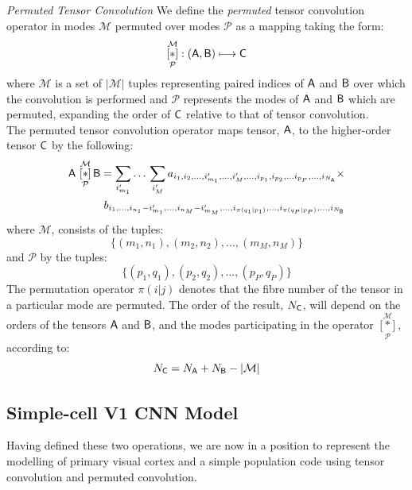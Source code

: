 \begin{definition}{\it Permuted Tensor Convolution} We define the {\it permuted} tensor convolution operator in modes $\mathcal{M}$ permuted over modes $\mathcal{P}$ as a mapping taking the form:
\[
 \underset{\mathcal{P}}{\overset{\mathcal{M}}{[ \ast ]}}: \left (\mathsf{A},\mathsf{B}  \right ) \longmapsto \mathsf{C}
\] 
 where $\mathcal{M}$ is a set of $|\mathcal{M}|$ tuples representing paired indices of $\mathsf{A}$ and $\mathsf{B}$ over which the convolution is performed and $\mathcal{P}$ represents the modes of $\mathsf{A}$ and $\mathsf{B}$ which are permuted, expanding the order of $\mathsf{C}$ relative to that of tensor convolution.\\

The permuted tensor convolution operator maps tensor, $\mathsf{A}$, to the higher-order tensor $\mathsf{C}$ by the following:
\begin{eqnarray}
\mathsf{A} \,\, \underset{\mathcal{P}}{\overset{\mathcal{M}}{[ \ast ]}}\, 
{\mathsf{B}} = \sum_{i'_{m_1}}\ldots\,\sum_{i_{M}'}  a_{i_1,i_2,...,i_{m_1}',...,i_{M}',...,i_{p_1},i_{p_2},...i_{p_P},...,i_{N_{\mathsf{A}}}} \times \nonumber \\
 b_{i_1,...,i_{n_1}-i_{m_1}',...,i_{n_M}-i_{m_M}',...,i_{\pi(q_1|p_1)},...,i_{\pi(q_P|p_P)},...,i_{N_{\mathsf{B}}}}
\label{eq:t2}
\end{eqnarray}
where $\mathcal{M}$, consists of the tuples:
\[
\lbrace(m_1,n_1),(m_2,n_2),...,(m_{M},n_{M})\rbrace
\]
and $\mathcal{P}$ by the tuples:
\[
\lbrace(p_1,q_1),(p_2,q_2),...,(p_{P},q_{P})\rbrace
\]
The permutation operator $\pi(i|j)$ denotes that the fibre number of the tensor in a particular mode are permuted.  The order of the result, $N_{\mathsf{C}}$, will depend on the orders of the tensors $\mathsf{A}$ and $\mathsf{B}$, and the modes participating in the operator $\underset{\mathcal{P}}{\overset{\mathcal{M}}{[ \ast ]}}$, according to:
\[
N_{\mathsf{C}} = N_{\mathsf{A}} + N_{\mathsf{B}} - |\mathcal{M}|
\]

\end{definition}

\subsection{Simple-cell V1 CNN Model}
Having defined these two operations, we are now in a position to represent the modelling of primary visual cortex and a simple population code using tensor convolution and permuted convolution. 

